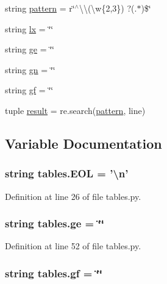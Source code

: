 \begin{DoxyCompactItemize}
\item 
string \hyperlink{namespacetables_a8bbd43050092a96f2ed859cd38010ac9}{pattern} = r\char`\"{}$^\wedge$\textbackslash{}\textbackslash{}(\textbackslash{}w\{2,3\}) ?(.$\ast$)\$\char`\"{}
\item 
string \hyperlink{namespacetables_a73769ae2602de53f31750beff002ea18}{lx} = \char`\"{}\char`\"{}
\item 
string \hyperlink{namespacetables_ad032d6e991aa7a99d280c0b933e6e3f3}{ge} = \char`\"{}\char`\"{}
\item 
string \hyperlink{namespacetables_a5707a1dd645c7d5ca668e14f4cc8bcb3}{gn} = \char`\"{}\char`\"{}
\item 
string \hyperlink{namespacetables_aa23af5c229aa39625a1c29112f4b1b17}{gf} = \char`\"{}\char`\"{}
\item 
tuple \hyperlink{namespacetables_a275d1c279456ee271849bbe69bf7cc33}{result} = re.\+search(\hyperlink{namespacetables_a8bbd43050092a96f2ed859cd38010ac9}{pattern}, line)
\end{DoxyCompactItemize}


\subsection{Variable Documentation}
\hypertarget{namespacetables_a6821e34021c9b7b076d5e9df10a2b64a}{
\subsubsection[{E\+O\+L}]{\setlength{\rightskip}{0pt plus 5cm}string tables.\+E\+O\+L = '\textbackslash{}n'}}\label{namespacetables_a6821e34021c9b7b076d5e9df10a2b64a}


Definition at line 26 of file tables.\+py.

\hypertarget{namespacetables_ad032d6e991aa7a99d280c0b933e6e3f3}{
\subsubsection[{ge}]{\setlength{\rightskip}{0pt plus 5cm}string tables.\+ge = \char`\"{}\char`\"{}}}\label{namespacetables_ad032d6e991aa7a99d280c0b933e6e3f3}


Definition at line 52 of file tables.\+py.

\hypertarget{namespacetables_aa23af5c229aa39625a1c29112f4b1b17}{
\subsubsection[{gf}]{\setlength{\rightskip}{0pt plus 5cm}string tables.\+gf = \char`\"{}\char`\"{}}}\label{namespacetables_aa23af5c229aa39625a1c29112f4b1b17}


